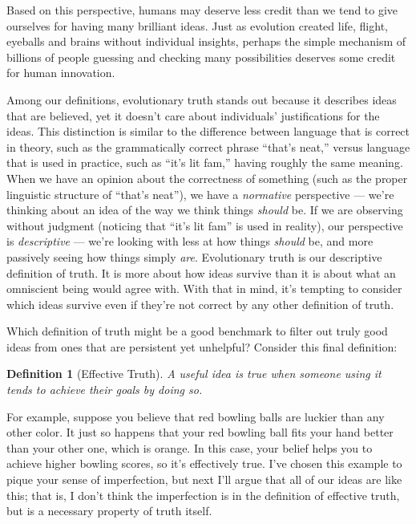 \documentclass[11pt, oneside]{article}
\newtheorem*{defn}{Definition}
\theoremstyle{argtstyle}
\begin{document}
Based on this perspective, humans
may deserve less credit than we tend to give ourselves for having many
brilliant ideas. Just as evolution created life, flight, eyeballs and
brains without individual insights, perhaps the simple mechanism of billions of
people guessing and checking many possibilities deserves some
credit for human innovation.

Among our definitions, evolutionary truth stands out because it describes
ideas that are believed, yet it doesn't
care about individuals' justifications for the ideas.
This distinction is similar to the difference
between language that is correct in theory, such as the grammatically
correct phrase ``that's neat,'' versus
language that is used in practice, such as ``it's lit fam,'' having roughly the
same meaning.
When we have an opinion about the correctness of something (such as the
proper linguistic structure of ``that's
neat''), we have a {\em
normative} perspective --- we're thinking about an idea
of the way we think things {\em should} be.
If we are observing
without judgment (noticing that ``it's lit fam'' is used in reality),
our perspective is {\em descriptive} --- we're looking with
less at how things {\em should} be, and more passively
seeing how things simply {\em are}.
Evolutionary truth is our descriptive definition of truth.
It is more about how ideas survive than it is about what an omniscient being
would agree with.
With that in mind, it's tempting to consider which ideas survive even
if they're not correct by any other definition of truth.

Which definition of truth might be a good benchmark to filter out truly
good ideas from ones that are persistent yet unhelpful?
Consider this final definition:
\begin{defn}[Effective Truth]\label{d8}
    A useful idea is true when someone using it tends to achieve their goals by
    doing so.
\end{defn}

For example, suppose you believe that red bowling balls are luckier than any
other color. It just so happens that your red bowling ball fits your hand better
than your other one, which is orange.
In this case, your belief helps you to
achieve higher bowling scores, so it's effectively true.
I've chosen this example to pique your sense of imperfection, but next I'll
argue that all of our ideas are like this; that is, I don't think the
imperfection is in the definition of effective truth,
but is a necessary property of truth itself.
\end{document}
